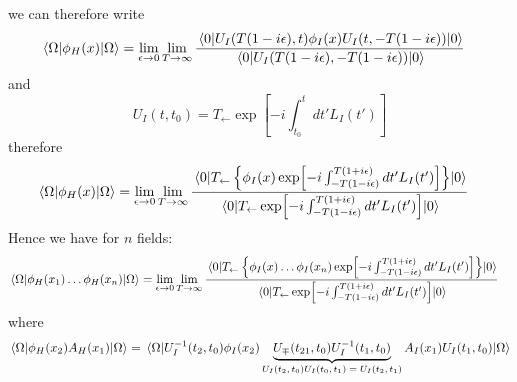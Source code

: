 we can therefore write 
\begin{align}
     \mel{\Omega}{  \phi_H (x) }{\Omega} 
     & =\lim_{\epsilon \to 0 } \lim_{T \to \infty}   \frac{ \mel{0}{U_{I} ( T(1 - i\epsilon) , t) \phi_I (x)  U_I (t, -T (1 - i\epsilon ))  }{0}}{\mel{0}{ U_I (T (1-  i\epsilon)  , -T (1 - i\epsilon) ) }{0}}
\end{align}
and \begin{equation}
    U_I (t, t_0) = T_{\leftarrow} \exp[-i \int_{t_0}^{t}  dt' L_I (t') ]
\end{equation}
therefore
\begin{align}
     \mel{\Omega}{  \phi_H (x) }{\Omega} 
     & =\lim_{\epsilon \to 0 } \lim_{T \to \infty}   \frac{ \mel{0}{  T_{\leftarrow} \left\{ \phi_I (x) \exp[-i \int_{-T (1 - i\epsilon) }^{T(1+i\epsilon)}  dt' L_I (t') ] \right\} }{0}}{\mel{0}{ T_{\leftarrow} \exp[-i \int_{-T (1 - i\epsilon) }^{T(1+i\epsilon)}  dt' L_I (t') ] }{0}}
\end{align}
Hence we have for $n$ fields:
\begin{align}
     \mel{\Omega}{  \phi_H (x_1) \dots \phi_H (x_n) }{\Omega} 
     & =\lim_{\epsilon \to 0 } \lim_{T \to \infty}   \frac{ \mel{0}{  T_{\leftarrow} \left\{ \phi_I (x) \dots \phi_{I} (x_n) \exp[-i \int_{-T (1 - i\epsilon) }^{T(1+i\epsilon)}  dt' L_I (t') ] \right\} }{0}}{\mel{0}{ T_{\leftarrow} \exp[-i \int_{-T (1 - i\epsilon) }^{T(1+i\epsilon)}  dt' L_I (t') ] }{0}}
\end{align}
where 
\begin{align}
    \mel{\Omega}{  \phi_H (x_2)  A_H (x_1) }{\Omega} = \mel{\Omega}{  U_{I}^{-1} (t_2, t_0)  \phi_I (x_2) \underbrace{U_{\mp} (t_{21}, t_0) U_{I}^{-1} (t_1, t_0)}_\text{$  U_I (t_2, t_0) U_I (t_0 , t_1) = U_I (t_2, t_1) $} A_I (x_1) U_I (t_1, t_0)   }{\Omega}
\end{align}






